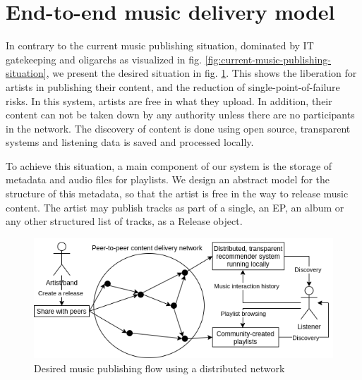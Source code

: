 \section{End-to-end music delivery model}
\label{sec:release-model}
In contrary to the current music publishing situation, dominated by IT gatekeeping and oligarchs as visualized in fig. \ref{fig:current-music-publishing-situation}, we present the desired situation in fig. \ref{fig:desired-music-publishing-situation}. This shows the liberation for artists in publishing their content, and the reduction of single-point-of-failure risks. In this system, artists are free in what they upload. In addition, their content can not be taken down by any authority unless there are no participants in the network. The discovery of content is done using open source, transparent systems and listening data is saved and processed locally.

To achieve this situation, a main component of our system is the storage of metadata and audio files for playlists. We design an abstract model for the structure of this metadata, so that the artist is free in the way to release music content. The artist may publish tracks as part of a single, an EP, an album or any other structured list of tracks, as a Release object.

\begin{figure}
    \centering
    \includegraphics[width=0.8\linewidth]{design/desired-music-publishing-situation.png}
    \caption{Desired music publishing flow using a distributed network}
    \label{fig:desired-music-publishing-situation}
\end{figure}

